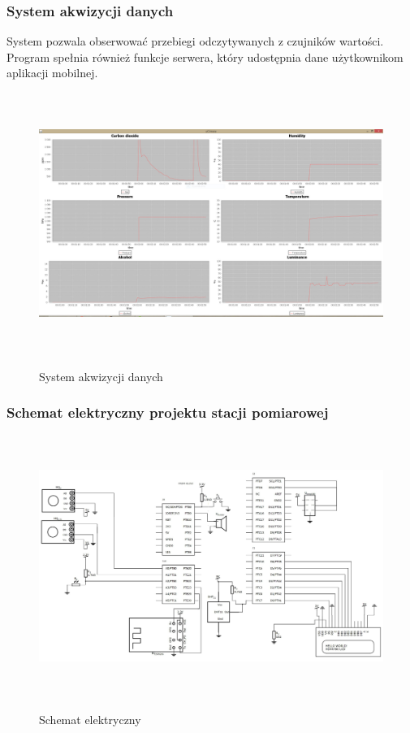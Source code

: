 \documentclass[12pt,a4paper]{article}
\begin{document}
\subsubsection{System akwizycji danych}
System pozwala obserwować przebiegi odczytywanych z czujników wartości. Program spełnia również funkcje serwera, który udostępnia dane użytkownikom aplikacji mobilnej.
\begin{figure}[!h]
	\centering
		\includegraphics[height =85mm]{wykresy.jpg}
		\label{wykresy}
		\caption{System akwizycji danych}
	\end{figure}

\newpage    
    
\subsubsection{Schemat elektryczny projektu stacji pomiarowej}    
	\begin{figure}[!h]
	\centering
		\includegraphics[height =85mm]{schemat.jpg}
		\label{schemat}
		\caption{Schemat elektryczny}
	\end{figure}
	
\end{document}
